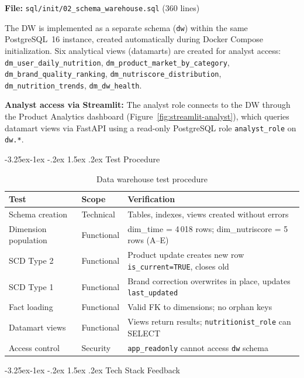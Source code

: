 \documentclass[a4paper,11pt,oneside,openany]{report}
\makeatletter
\renewcommand\subsection{\@startsection{subsection}{2}{\z@}%
  {-3.25ex\@plus -1ex \@minus -.2ex}%
  {1.5ex \@plus .2ex}%
  {\normalfont\large\bfseries\color{ntdarkgreen}}}
\makeatother
\begin{document}
\textbf{File:} \texttt{sql/init/02\_schema\_warehouse.sql} (360 lines)

The DW is implemented as a separate schema (\texttt{dw}) within the same
PostgreSQL~16 instance, created automatically during Docker Compose
initialization. Six analytical views (datamarts) are created for analyst
access: \texttt{dm\_user\_daily\_nutrition},
\texttt{dm\_product\_market\_by\_category},
\texttt{dm\_brand\_quality\_ranking},
\texttt{dm\_nutriscore\_distribution},
\texttt{dm\_nutrition\_trends},
\texttt{dm\_dw\_health}.

\textbf{Analyst access via Streamlit:} The analyst role connects to the DW
through the Product Analytics dashboard (Figure~\ref{fig:streamlit-analyst}),
which queries datamart views via FastAPI using a read-only PostgreSQL role
\texttt{analyst\_role} on \texttt{dw.*}.

\subsection{Test Procedure}

\begin{table}[H]
\centering
\caption{Data warehouse test procedure}
\label{tab:test-dw}
\begin{tabularx}{\textwidth}{L{3cm} L{2cm} L{7.5cm}}
\toprule
\textbf{Test} & \textbf{Scope} & \textbf{Verification} \\
\midrule
Schema creation & Technical & Tables, indexes, views created without errors \\
Dimension population & Functional & dim\_time = 4\,018 rows; dim\_nutriscore = 5 rows (A--E) \\
SCD Type 2 & Functional & Product update creates new row \texttt{is\_current=TRUE}, closes old \\
SCD Type 1 & Functional & Brand correction overwrites in place, updates \texttt{last\_updated} \\
Fact loading & Functional & Valid FK to dimensions; no orphan keys \\
Datamart views & Functional & Views return results; \texttt{nutritionist\_role} can SELECT \\
Access control & Security & \texttt{app\_readonly} cannot access \texttt{dw} schema \\
\bottomrule
\end{tabularx}
\end{table}

\subsection{Tech Stack Feedback}
\end{document}
